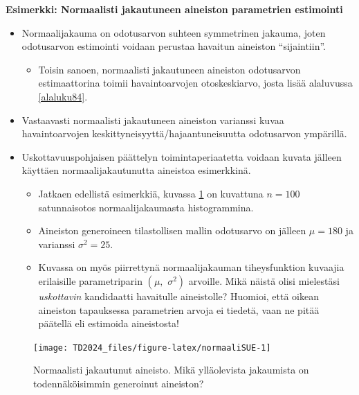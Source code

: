 \documentclass[
]{book}
\providecommand{\tightlist}{%
  \setlength{\itemsep}{0pt}\setlength{\parskip}{0pt}}
\begin{document}
\begin{eblock}{}

\textbf{Esimerkki: Normaalisti jakautuneen aineiston parametrien estimointi}

\begin{itemize}
\item
  Normaalijakauma on odotusarvon suhteen symmetrinen jakauma, joten odotusarvon estimointi voidaan perustaa havaitun aineiston ``sijaintiin''.

  \begin{itemize}
  \tightlist
  \item
    Toisin sanoen, normaalisti jakautuneen aineiston odotusarvon estimaattorina toimii havaintoarvojen otoskeskiarvo, josta lisää alaluvussa \ref{alaluku84}.
  \end{itemize}
\item
  Vastaavasti normaalisti jakautuneen aineiston varianssi kuvaa havaintoarvojen keskittyneisyyttä/hajaantuneisuutta odotusarvon ympärillä.
\item
  Uskottavuuspohjaisen päättelyn toimintaperiaatetta voidaan kuvata jälleen käyttäen normaalijakautunutta aineistoa esimerkkinä.

  \begin{itemize}
  \tightlist
  \item
    Jatkaen edellistä esimerkkiä, kuvassa \ref{fig:normaaliSUE} on kuvattuna \(n=100\) satunnaisotos normaalijakaumasta histogrammina.
  \item
    Aineiston generoineen tilastollisen mallin odotusarvo on jälleen \(\mu = 180\) ja varianssi \(\sigma^2 = 25\).
  \item
    Kuvassa on myös piirrettynä normaalijakauman tiheysfunktion kuvaajia erilaisille parametriparin \((\mu, \,\, \sigma^2)\) arvoille. Mikä näistä olisi mielestäsi \emph{uskottavin} kandidaatti havaitulle aineistolle? Huomioi, että oikean aineiston tapauksessa parametrien arvoja ei tiedetä, vaan ne pitää päätellä eli estimoida aineistosta!
  \end{itemize}
\end{itemize}

\end{eblock}

\begin{figure}

{\centering \texttt{[image: TD2024\_files/figure-latex/normaaliSUE-1]} 

}

\caption{Normaalisti jakautunut aineisto. Mikä ylläolevista jakaumista on todennäköisimmin generoinut aineiston?}\label{fig:normaaliSUE}
\end{figure}
\end{document}

